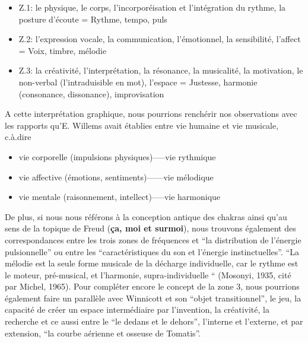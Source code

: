 \begin{itemize}
 \item  Z.1: le physique, le corps, l'incorporéisation et
l'intégration du rythme,
la posture d'écoute  =  Rythme, tempo, puls 

\item  Z.2:  l'expression vocale, la communication,
l'émotionnel, la sensibilité, l'affect = Voix, timbre, mélodie 

\item Z.3: la créativité, l'interprétation, la
résonance, la musicalité, la motivation, le non-verbal (l'intraduisible en mot), l'espace = Justesse, harmonie (consonance,
dissonance), improvisation 

\end{itemize}
A cette interprétation graphique, nous pourrions renchérir nos
observations avec les rapports
qu'E.
Willems  avait établies entre vie humaine et vie musicale, c.à.dire
\begin{itemize}
  \item vie corporelle (impulsions physiques)-----vie rythmique
  \item vie affective (émotions, sentiments)------vie mélodique
    \item vie mentale (raisonnement, intellect)-----vie harmonique
\end{itemize}

De plus, si nous nous référons à la conception antique des chakras ainsi qu'au sens de la
topique de Freud (\textbf{ça, moi et surmoi}), nous trouvons également des correspondances
entre les trois zones de 
fréquences et ``la distribution de l'énergie pulsionnelle'' ou entre
les 
``caractéristiques du son et l'énergie instinctuelles''\autocite[ch. 13]{auriol:cle}.
``La mélodie est la seule forme musicale de la décharge individuelle, car le rythme est le moteur, pré-musical, et l'harmonie, supra-individuelle `` (Mosonyi, 1935, cité par Michel, 1965).
Pour compléter encore le concept de la zone 3, nous pourrions
également faire un parallèle avec Winnicott et son ``objet
transitionnel'', le jeu, la capacité de créer un espace
intermédiaire par l'invention, la créativité, la recherche et ce aussi entre le ``le
dedans et le
dehors'', l'interne et l'externe,  et par extension, ``la courbe aérienne et osseuse de Tomatis''.
 
